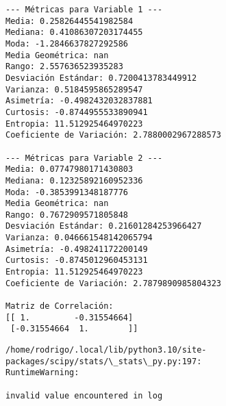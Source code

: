 \documentclass[11pt]{article}
\begin{document}
    \begin{Verbatim}[commandchars=\\\{\}]
--- Métricas para Variable 1 ---
Media: 0.25826445541982584
Mediana: 0.41086307203174455
Moda: -1.2846637827292586
Media Geométrica: nan
Rango: 2.557636523935283
Desviación Estándar: 0.7200413783449912
Varianza: 0.5184595865289547
Asimetría: -0.4982432032837881
Curtosis: -0.8744955533890941
Entropia: 11.512925464970223
Coeficiente de Variación: 2.7880002967288573

--- Métricas para Variable 2 ---
Media: 0.07747980171430803
Mediana: 0.12325892160952336
Moda: -0.3853991348187776
Media Geométrica: nan
Rango: 0.7672909571805848
Desviación Estándar: 0.21601284253966427
Varianza: 0.046661548142065794
Asimetría: -0.498241172200149
Curtosis: -0.8745012960453131
Entropia: 11.512925464970223
Coeficiente de Variación: 2.7879890985804323

Matriz de Correlación:
[[ 1.         -0.31554664]
 [-0.31554664  1.        ]]
    \end{Verbatim}

    \begin{Verbatim}[commandchars=\\\{\}]
/home/rodrigo/.local/lib/python3.10/site-packages/scipy/stats/\_stats\_py.py:197:
RuntimeWarning:

invalid value encountered in log

    \end{Verbatim}

    \begin{center}
    \end{center}
    { \hspace*{\fill} \\}
    
    \begin{center}
    \end{center}
    { \hspace*{\fill} \\}
    
    \begin{center}
    \end{center}
    { \hspace*{\fill} \\}
    
\end{document}
